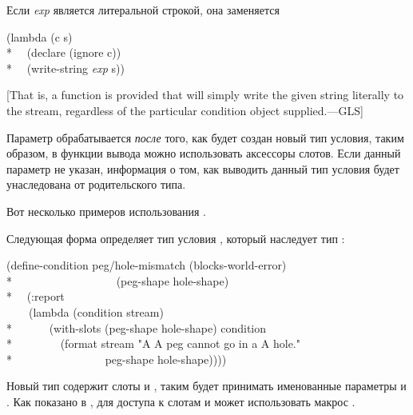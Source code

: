 \begin{defmac}
\begin{flushdesc}
  Если \emph{exp} является литеральной строкой, она заменяется
  \begin{lisp}
    (lambda (c s) \\*
    ~~(declare (ignore c)) \\*
    ~~(write-string \emph{exp} s))
  \end{lisp}
  [That is, a function is provided that will simply write the given
  string literally to the stream, regardless of the particular condition object
  supplied.---GLS]
  
  Параметр  обрабатывается \emph{после} того, как будет создан новый
  тип условия, таким образом, в функции вывода можно использовать аксессоры
  слотов. Если данный параметр не указан, информация о том, как выводить данный
  тип условия будет унаследована от родительского типа.
  
\end{flushdesc}

Вот несколько примеров использования .

Следующая форма определяет тип условия , который наследует
тип :
\begin{lisp}
(define-condition peg/hole-mismatch (blocks-world-error) \\*
~~~~~~~~~~~~~~~~~~(peg-shape hole-shape) \\*
~~(:report \\
~~~~(lambda (condition stream) \\*
~~~~~~(with-slots (peg-shape hole-shape) condition \\*
~~~~~~~~(format stream "A {\Xtilde}A peg cannot go in a {\Xtilde}A hole." \\*
~~~~~~~~~~~~~~~~peg-shape hole-shape))))
\end{lisp}
Новый тип содержит слоты  и , таким
 будет принимать именованные параметры  и
. Как показано в , для доступа к слотам
 и может использовать макрос .


\end{defmac}
